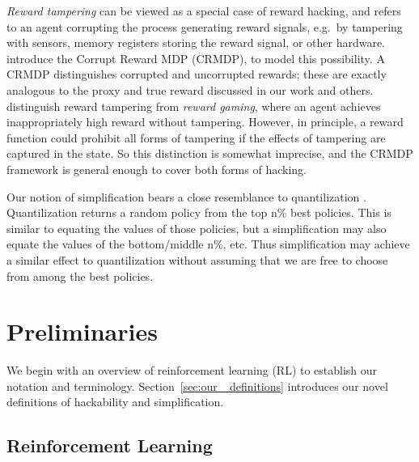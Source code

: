 \documentclass{article}
\theoremstyle{definition}
\theoremstyle{remark}
\begin{document}
\textit{Reward tampering} \citep{everitt2017reinforcement, kumar2020realab, uesato2020avoiding, everitt2021reward} can be viewed as a special case of reward hacking, and refers to an agent corrupting the process generating reward signals, e.g.\ by tampering with sensors, memory registers storing the reward signal, or other hardware.
\citet{everitt2017reinforcement} introduce the Corrupt Reward MDP (CRMDP), to model this possibility. 
A CRMDP distinguishes corrupted and uncorrupted rewards; these are exactly analogous to the proxy and true reward discussed in our work and others.
\citet{leike2018scalable} distinguish reward tampering from \textit{reward gaming}, where an agent achieves inappropriately high reward without tampering.
However, in principle, a reward function could prohibit all forms of tampering if the effects of tampering are captured in the state.
So this distinction is somewhat imprecise, and the CRMDP framework is general enough to cover both forms of hacking.

Our notion of simplification bears a close resemblance to quantilization \citep{taylor2016quantilizers}.
Quantilization returns a random policy from the top n\% best policies.
This is similar to equating the values of those policies, but a simplification may also equate the values of the bottom/middle n\%, etc.
Thus simplification may achieve a similar effect to quantilization without assuming that we are free to choose from among the best policies.









\section{Preliminaries}

We begin with an overview of reinforcement learning (RL) to establish our notation and terminology.
Section~\ref{sec:our_ definitions} introduces our novel definitions of hackability and simplification.

\subsection{Reinforcement Learning}\label{sec: reinforcement learning}
\end{document}
